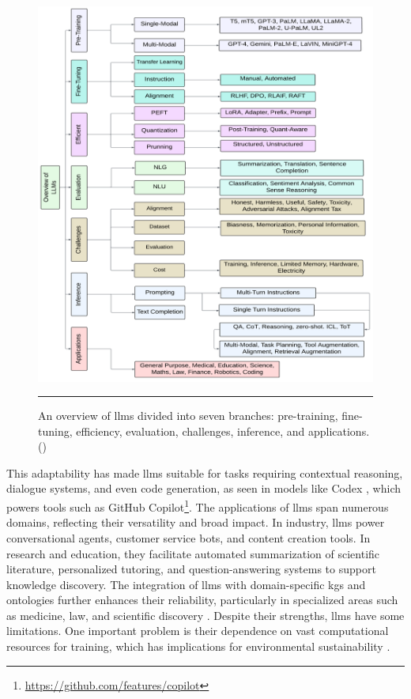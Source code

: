 \begin{figure}[htbp]
    \centering
 \includegraphics[width=.8\textwidth]{figures/literature-review/llms-overview.png}
     \rule{35em}{0.5pt}
    \caption{An overview of \glspl{llm} divided into seven branches: pre-training, fine-tuning, efficiency, evaluation, challenges, inference, and applications. (\textcite{Naveed2023})}
 \label{fig:llms-overview}
\end{figure}
\newpage
This adaptability has made \glspl{llm} suitable for tasks requiring contextual reasoning, dialogue systems, and even code generation, as seen in models like Codex \cite{Chen2021EvaluatingLL}, which powers tools such as GitHub Copilot\footnote{\url{https://github.com/features/copilot}}.
The applications of \glspl{llm} span numerous domains, reflecting their versatility and broad impact.
In industry, \glspl{llm} power conversational agents, customer service bots, and content creation tools.
In research and education, they facilitate automated summarization of scientific literature, personalized tutoring, and question-answering systems to support knowledge discovery.
The integration of \glspl{llm} with domain-specific \glspl{kg} and ontologies further enhances their reliability, particularly in specialized areas such as medicine, law, and scientific discovery \cite{Yang2024}.
Despite their strengths, \glspl{llm} have some limitations.
One important problem is their dependence on vast computational resources for training, which has implications for environmental sustainability \cite{Strubell2019EnergyAP}.
